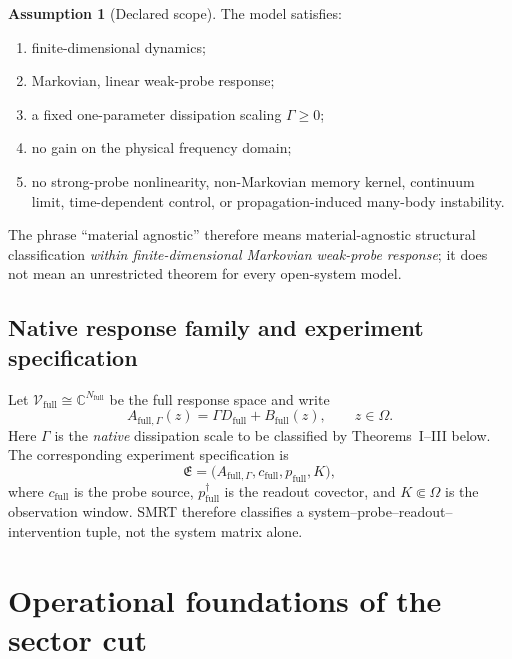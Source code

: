 \documentclass[11pt]{article}
\theoremstyle{definition}
\newtheorem{assumption}[theorem]{Assumption}
\theoremstyle{remark}
\theoremstyle{plain}
\newcommand{\V}{\mathcal V}
\newcommand{\C}{\mathbb C}
\newcommand{\full}{\mathrm{full}}
\newcommand{\ExpSpec}{\mathfrak E}
\begin{document}
\begin{assumption}[Declared scope]\label{ass:scope}
The model satisfies:
\begin{enumerate}[label=(A\arabic*)]
  \item finite-dimensional dynamics;
  \item Markovian, linear weak-probe response;
  \item a fixed one-parameter dissipation scaling $\Gamma\ge 0$;
  \item no gain on the physical frequency domain;
  \item no strong-probe nonlinearity, non-Markovian memory kernel, continuum limit, time-dependent control, or propagation-induced many-body instability.
\end{enumerate}
\end{assumption}

The phrase ``material agnostic'' therefore means material-agnostic structural classification \emph{within finite-dimensional Markovian weak-probe response}; it does not mean an unrestricted theorem for every open-system model.

\subsection{Native response family and experiment specification}
Let $\V_{\full}\cong\C^{N_{\full}}$ be the full response space and write
\begin{equation}\label{eq:full-family}
  A_{\full,\Gamma}(z)=\Gamma D_{\full}+B_{\full}(z),
  \qquad z\in\Omega.
\end{equation}
Here $\Gamma$ is the \emph{native} dissipation scale to be classified by Theorems~I--III below.  The corresponding experiment specification is
\begin{equation}\label{eq:experiment-specification}
  \ExpSpec=\bigl(A_{\full,\Gamma},c_{\full},p_{\full},K\bigr),
\end{equation}
where $c_{\full}$ is the probe source, $p_{\full}^{\dagger}$ is the readout covector, and $K\Subset\Omega$ is the observation window.  SMRT therefore classifies a system--probe--readout--intervention tuple, not the system matrix alone.

\section{Operational foundations of the sector cut}\label{sec:operational}
\end{document}

